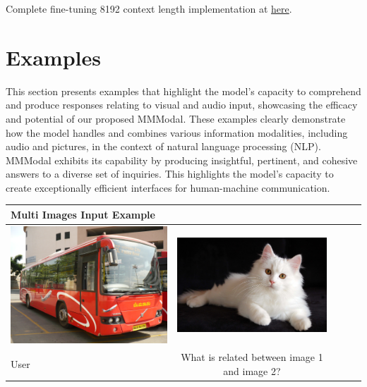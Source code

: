 \documentclass[preprint]{article}
\begin{document}
Complete fine-tuning 8192 context length implementation at \href{https://github.com/mesolitica/multimodal-LLM/blob/master/run-deepspeed.sh}{here}.

\section{Examples}

This section presents examples that highlight the model's capacity to comprehend and produce responses relating to visual and audio input, showcasing the efficacy and potential of our proposed MMModal. These examples clearly demonstrate how the model handles and combines various information modalities, including audio and pictures, in the context of natural language processing (NLP). MMModal exhibits its capability by producing insightful, pertinent, and cohesive answers to a diverse set of inquiries. This highlights the model's capacity to create exceptionally efficient interfaces for human-machine communication.

\begin{table}[hbt!]
  \setlength{\extrarowheight}{3pt} %
  \renewcommand{\arraystretch}{1.5} %
  \begin{tabular}{lcccl}
    \hline
    \textbf{Multi Images Input Example}                                                                                                                    \\[6pt]  %
    \hline
    \hline
    \includegraphics[width=0.45\linewidth,keepaspectratio]{pic/R.jpeg} & \includegraphics[width=0.45\linewidth,keepaspectratio]{pic/Persian-cat-breed.jpg} \\
    User                                                               & What is related between image 1 and image 2?                                      \\
    \hline
  \end{tabular}
\end{table}
\end{document}
